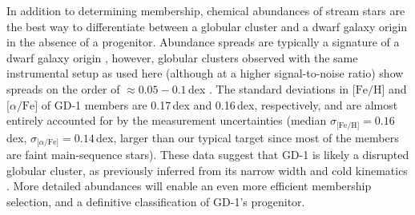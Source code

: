 \documentclass[twocolumn]{aastex63}
\newcommand{\feh}{\ensuremath{\textrm{[Fe/H]}}}
\newcommand{\afe}{\ensuremath{\textrm{[$\alpha$/Fe]}}}
\begin{document}
In addition to determining membership, chemical abundances of stream stars are the best way to differentiate between a globular cluster and a dwarf galaxy origin in the absence of a progenitor.
Abundance spreads are typically a signature of a dwarf galaxy origin \citep[e.g.,][]{willman2012}, however, globular clusters observed with the same instrumental setup as used here (although at a higher signal-to-noise ratio) show spreads on the order of $\approx0.05-0.1$\,dex \citep{cargile2019}.
The standard deviations in $\feh$ and $\afe$ of GD-1 members are 0.17\,dex and 0.16\,dex, respectively, and are almost entirely accounted for by the measurement uncertainties (median $\sigma_\feh=0.16$\,dex, $\sigma_\afe=0.14$\,dex, larger than our typical target since most of the members are faint main-sequence stars).
These data suggest that GD-1 is likely a disrupted globular cluster, as previously inferred from its narrow width \citep[e.g.,][]{grillmair2006} and cold kinematics \citep[e.g.,][]{malhan2019}.
More detailed abundances will enable an even more efficient membership selection, and a definitive classification of GD-1's progenitor.







\end{document}
